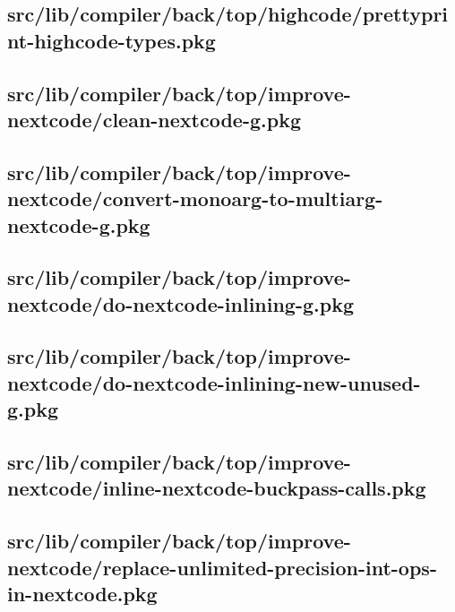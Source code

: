 \subsection{src/lib/compiler/back/top/highcode/prettyprint-highcode-types.pkg}


\subsection{src/lib/compiler/back/top/improve-nextcode/clean-nextcode-g.pkg}


\subsection{src/lib/compiler/back/top/improve-nextcode/convert-monoarg-to-multiarg-nextcode-g.pkg}


\subsection{src/lib/compiler/back/top/improve-nextcode/do-nextcode-inlining-g.pkg}


\subsection{src/lib/compiler/back/top/improve-nextcode/do-nextcode-inlining-new-unused-g.pkg}


\subsection{src/lib/compiler/back/top/improve-nextcode/inline-nextcode-buckpass-calls.pkg}


\subsection{src/lib/compiler/back/top/improve-nextcode/replace-unlimited-precision-int-ops-in-nextcode.pkg}


